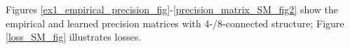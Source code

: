 \documentclass[a4paper]{article}
\theoremstyle{definition}
\theoremstyle{plain}
\begin{document}
Figures \ref{ex1_empirical_precision_fig}-\ref{precision_matrix_SM_fig2} show the empirical and learned precision matrices with 4-/8-connected structure; Figure \ref{loss_SM_fig} illustrates losses.


\begin{comment}
\begin{figure}[H]
	\centering
	\begin{subfigure}[b]{0.3\textwidth}
		
	\end{subfigure}
	\hfill
	\begin{subfigure}[b]{0.3\textwidth}
		
	\end{subfigure}
	\hfill
		\begin{subfigure}[b]{0.3\textwidth}
		
	\end{subfigure}
	\caption{Samples drawn from $\mathcal{N}(\mathbf{0},\Sigma_\theta)$ with 4-connected precision matrix (SM).}
\end{figure}

\begin{figure}[H]
	\centering
	\begin{subfigure}[b]{0.3\textwidth}
		
	\end{subfigure}
	\hfill
	\begin{subfigure}[b]{0.3\textwidth}
		
	\end{subfigure}
	\hfill
		\begin{subfigure}[b]{0.3\textwidth}
		
	\end{subfigure}
	\caption{Samples drawn from $\mathcal{N}(\mathbf{0},\Sigma_\theta)$ with 8-connected precision matrix (SM).}
\end{figure}
\end{comment}
\end{document}

